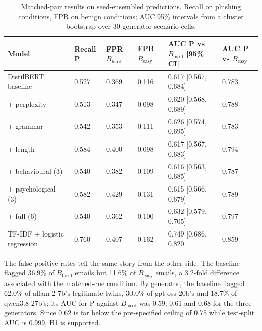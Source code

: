 \documentclass[11pt,letterpaper]{article}
\begin{document}
\begin{table}[!htbp]
\centering
\footnotesize
\caption{Matched-pair results on seed-ensembled predictions. Recall on phishing conditions, FPR on benign conditions; AUC 95\% intervals from a cluster bootstrap over 30 generator-scenario cells.}
\begin{tabularx}{\linewidth}{YlllYl}
\toprule
\textbf{Model} & \textbf{Recall P} & \textbf{FPR $B_{\mathrm{hard}}$} & \textbf{FPR $B_{\mathrm{easy}}$} & \textbf{AUC P vs $B_{\mathrm{hard}}$ [95\% CI]} & \textbf{AUC P vs $B_{\mathrm{easy}}$} \\
\midrule
DistilBERT baseline & 0.527 & 0.369 & 0.116 & 0.617 [0.567, 0.684] & 0.783 \\
+ perplexity & 0.513 & 0.347 & 0.098 & 0.620 [0.568, 0.689] & 0.788 \\
+ grammar & 0.542 & 0.353 & 0.111 & 0.626 [0.574, 0.695] & 0.783 \\
+ length & 0.584 & 0.400 & 0.098 & 0.617 [0.567, 0.683] & 0.794 \\
+ behavioural (3) & 0.540 & 0.382 & 0.109 & 0.616 [0.563, 0.685] & 0.787 \\
+ psychological (3) & 0.582 & 0.429 & 0.131 & 0.615 [0.566, 0.679] & 0.789 \\
+ full (6) & 0.540 & 0.362 & 0.100 & 0.632 [0.579, 0.705] & 0.797 \\
TF-IDF + logistic regression & 0.760 & 0.407 & 0.162 & 0.749 [0.686, 0.820] & 0.859 \\
\bottomrule
\end{tabularx}
\end{table}

The false-positive rates tell the same story from the other side. The baseline flagged 36.9\% of $B_{\mathrm{hard}}$ emails but 11.6\% of $B_{\mathrm{easy}}$ emails, a 3.2-fold difference associated with the matched-cue condition. By generator, the baseline flagged 62.0\% of allam-2-7b's legitimate twins, 30.0\% of gpt-oss-20b's and 18.7\% of qwen3.8-27b's; its AUC for P against $B_{\mathrm{hard}}$ was 0.59, 0.61 and 0.68 for the three generators. Since 0.62 is far below the pre-specified ceiling of 0.75 while test-split AUC is 0.999, H1 is supported.
\end{document}
